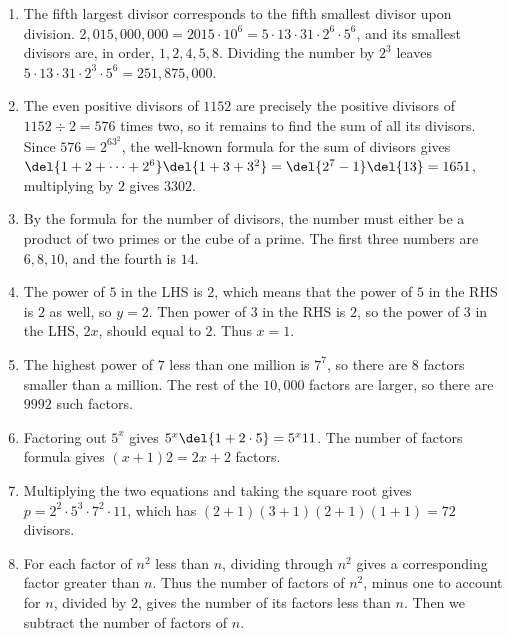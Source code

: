 \documentclass[10pt,paper=letter]{scrartcl}
\begin{document}
\begin{enumerate}

\item The fifth largest divisor corresponds to the fifth smallest divisor upon division. $2{,}015{,}000{,}000 = 2015 \cdot 10^6 = 5 \cdot 13 \cdot 31 \cdot 2^6 \cdot 5^6$, and its smallest divisors are, in order, $1, 2, 4, 5, 8$. Dividing the number by $2^3$ leaves $5 \cdot 13 \cdot 31 \cdot 2^3 \cdot 5^6 = 251{,}875{,}000$.

\item The even positive divisors of $1152$ are precisely the positive divisors of $1152 \div 2 = 576$ times two, so it remains to find the sum of all its divisors. Since $576 = 2^63^2$, the well-known formula for the sum of divisors gives $\del{1 + 2 + \cdots + 2^6}\del{1 + 3 + 3^2} = \del{2^7 - 1}\del{13} = 1651$, multiplying by $2$ gives $3302$.

\item By the formula for the number of divisors, the number must either be a product of two primes or the cube of a prime. The first three numbers are $6, 8, 10$, and the fourth is $14$.

\item The power of $5$ in the LHS is $2$, which means that the power of $5$ in the RHS is $2$ as well, so $y = 2$. Then power of $3$ in the RHS is $2$, so the power of $3$ in the LHS, $2x$, should equal to $2$. Thus $x = 1$.

\item The highest power of $7$ less than one million is $7^7$, so there are $8$ factors smaller than a million. The rest of the $10{,}000$ factors are larger, so there are $9992$ such factors.

\item Factoring out $5^x$ gives $5^x\del{1 + 2\cdot5} = 5^x11$. The number of factors formula gives $(x+1)2 = 2x + 2$ factors. 

\item Multiplying the two equations and taking the square root gives $p = 2^2 \cdot 5^3 \cdot 7^2 \cdot 11$, which has $(2+1)(3+1)(2+1)(1+1) = 72$ divisors.

\item For each factor of $n^2$ less than $n$, dividing through $n^2$ gives a corresponding factor greater than $n$. Thus the number of factors of $n^2$, minus one to account for $n$, divided by $2$, gives the number of its factors less than $n$. Then we subtract the number of factors of $n$.


\end{enumerate}
\end{document}
